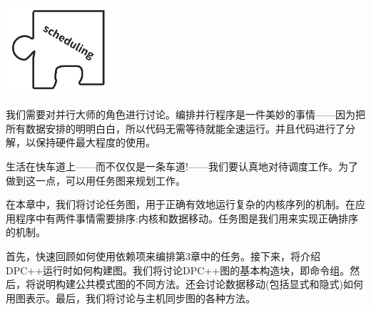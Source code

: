 \begin{center}
	\includegraphics[width=0.3\textwidth]{content/chapter-8/images/1}
\end{center}

我们需要对并行大师的角色进行讨论。编排并行程序是一件美妙的事情——因为把所有数据安排的明明白白，所以代码无需等待就能全速运行。并且代码进行了分解，以保持硬件最大程度的使用。\par

生活在快车道上——而不仅仅是一条车道!——我们要认真地对待调度工作。为了做到这一点，可以用任务图来规划工作。\par

在本章中，我们将讨论任务图，用于正确有效地运行复杂的内核序列的机制。在应用程序中有两件事情需要排序:内核和数据移动。任务图是我们用来实现正确排序的机制。\par

首先，快速回顾如何使用依赖项来编排第3章中的任务。接下来，将介绍DPC++运行时如何构建图。我们将讨论DPC++图的基本构造块，即命令组。然后，将说明构建公共模式图的不同方法。还会讨论数据移动(包括显式和隐式)如何用图表示。最后，我们将讨论与主机同步图的各种方法。\par